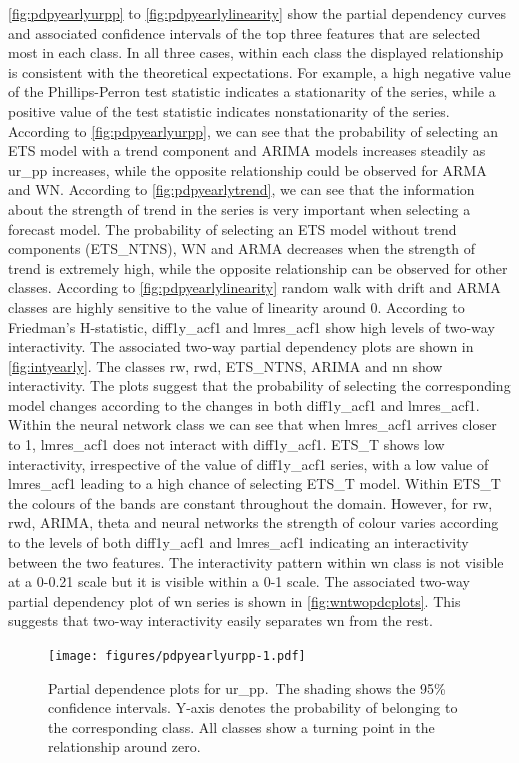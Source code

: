 \documentclass[11pt,a4paper,]{article}
\begin{document}
\autoref{fig:pdpyearlyurpp} to \autoref{fig:pdpyearlylinearity} show the partial dependency curves and associated confidence intervals of the top three features that are selected most in each class. In all three cases, within each class the displayed relationship is consistent with the theoretical expectations. For example, a high negative value of the Phillips-Perron test statistic indicates a stationarity of the series, while a positive value of the test statistic indicates nonstationarity of the series. According to \autoref{fig:pdpyearlyurpp}, we can see that the probability of selecting an ETS model with a trend component and ARIMA models increases steadily as ur\_pp increases, while the opposite relationship could be observed for ARMA and WN. According to \autoref{fig:pdpyearlytrend}, we can see that the information about the strength of trend in the series is very important when selecting a forecast model. The probability of selecting an ETS model without trend components (ETS\_NTNS), WN and ARMA decreases when the strength of trend is extremely high, while the opposite relationship can be observed for other classes. According to \autoref{fig:pdpyearlylinearity} random walk with drift and ARMA classes are highly sensitive to the value of linearity around 0. According to Friedman's H-statistic, diff1y\_acf1 and lmres\_acf1 show high levels of two-way interactivity. The associated two-way partial dependency plots are shown in \autoref{fig:intyearly}. The classes rw, rwd, ETS\_NTNS, ARIMA and nn show interactivity. The plots suggest that the probability of selecting the corresponding model changes according to the changes in both diff1y\_acf1 and lmres\_acf1. Within the neural network class we can see that when lmres\_acf1 arrives closer to 1, lmres\_acf1 does not interact with diff1y\_acf1. ETS\_T shows low interactivity, irrespective of the value of diff1y\_acf1 series, with a low value of lmres\_acf1 leading to a high chance of selecting ETS\_T model. Within ETS\_T the colours of the bands are constant throughout the domain. However, for rw, rwd, ARIMA, theta and neural networks the strength of colour varies according to the levels of both diff1y\_acf1 and lmres\_acf1 indicating an interactivity between the two features. The interactivity pattern within wn class is not visible at a 0-0.21 scale but it is visible within a 0-1 scale. The associated two-way partial dependency plot of wn series is shown in \autoref{fig:wntwopdcplots}. This suggests that two-way interactivity easily separates wn from the rest.

\begin{figure}
\centering
\texttt{[image: figures/pdpyearlyurpp-1.pdf]}
\caption{\label{fig:pdpyearlyurpp}Partial dependence plots for ur\_pp.~The shading shows the 95\% confidence intervals. Y-axis denotes the probability of belonging to the corresponding class. All classes show a turning point in the relationship around zero.}
\end{figure}
\end{document}
